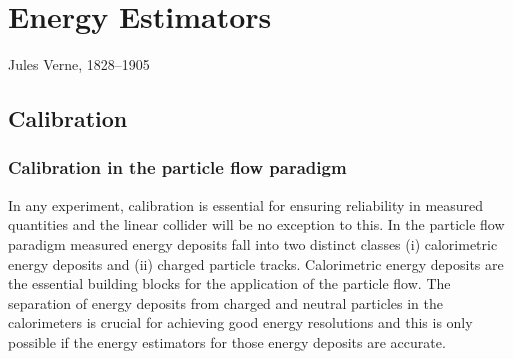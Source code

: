 \chapter{Energy Estimators}
\label{chap:MoreStuff}

{Jules Verne, 1828--1905}


\section{Calibration}


\subsection{Calibration in the particle flow paradigm}

In any experiment, calibration is essential for ensuring reliability in measured quantities and the linear collider will be no exception to this.  In the particle flow paradigm measured energy deposits fall into two distinct classes (i) calorimetric energy deposits and (ii) charged particle tracks.  Calorimetric energy deposits are the essential building blocks for the application of the particle flow.  The separation of energy deposits from charged and neutral particles in the calorimeters is crucial for achieving good energy resolutions and this is only possible if the energy estimators for those energy deposits are accurate.  



